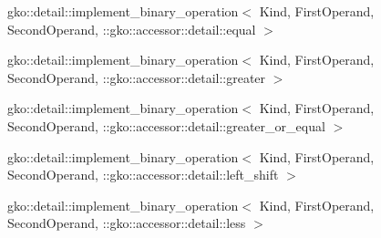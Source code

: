\begin{DoxyCompactList}
\begin{DoxyCompactList}
\item {}
\end{DoxyCompactList}
\item gko\+:\+:detail\+:\+:implement\+\_\+binary\+\_\+operation$<$ Kind, First\+Operand, Second\+Operand, \+:\+:gko\+:\+:accessor\+:\+:detail\+:\+:equal $>$\begin{DoxyCompactList}
\item {}
\end{DoxyCompactList}
\item gko\+:\+:detail\+:\+:implement\+\_\+binary\+\_\+operation$<$ Kind, First\+Operand, Second\+Operand, \+:\+:gko\+:\+:accessor\+:\+:detail\+:\+:greater $>$\begin{DoxyCompactList}
\item {}
\end{DoxyCompactList}
\item gko\+:\+:detail\+:\+:implement\+\_\+binary\+\_\+operation$<$ Kind, First\+Operand, Second\+Operand, \+:\+:gko\+:\+:accessor\+:\+:detail\+:\+:greater\+\_\+or\+\_\+equal $>$\begin{DoxyCompactList}
\item {}
\end{DoxyCompactList}
\item gko\+:\+:detail\+:\+:implement\+\_\+binary\+\_\+operation$<$ Kind, First\+Operand, Second\+Operand, \+:\+:gko\+:\+:accessor\+:\+:detail\+:\+:left\+\_\+shift $>$\begin{DoxyCompactList}
\item {}
\end{DoxyCompactList}
\item gko\+:\+:detail\+:\+:implement\+\_\+binary\+\_\+operation$<$ Kind, First\+Operand, Second\+Operand, \+:\+:gko\+:\+:accessor\+:\+:detail\+:\+:less $>$\begin{DoxyCompactList}

\end{DoxyCompactList}
\end{DoxyCompactList}

